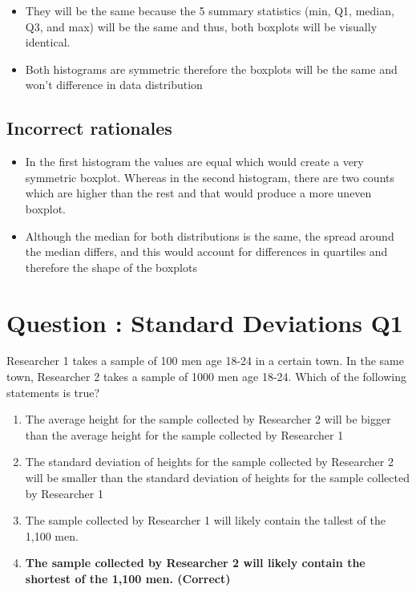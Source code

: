 \documentclass[letterpaper,9pt,twoside,printwatermark=false]{pinp}
\providecommand{\tightlist}{%
  \setlength{\itemsep}{0pt}\setlength{\parskip}{0pt}}
\begin{document}
\begin{itemize}
\tightlist
\item
  They will be the same because the 5 summary statistics (min, Q1,
  median, Q3, and max) will be the same and thus, both boxplots will be
  visually identical.
\item
  Both histograms are symmetric therefore the boxplots will be the same
  and won't difference in data distribution
\end{itemize}

\subsection{Incorrect rationales}\label{incorrect-rationales-2}

\begin{itemize}
\tightlist
\item
  In the first histogram the values are equal which would create a very
  symmetric boxplot. Whereas in the second histogram, there are two
  counts which are higher than the rest and that would produce a more
  uneven boxplot.
\item
  Although the median for both distributions is the same, the spread
  around the median differs, and this would account for differences in
  quartiles and therefore the shape of the boxplots
\end{itemize}

\section{Question : Standard Deviations
Q1}\label{question-standard-deviations-q1}

Researcher 1 takes a sample of 100 men age 18-24 in a certain town. In
the same town, Researcher 2 takes a sample of 1000 men age 18-24. Which
of the following statements is true?

\begin{enumerate}
\def\labelenumi{\alph{enumi})}
\tightlist
\item
  The average height for the sample collected by Researcher 2 will be
  bigger than the average height for the sample collected by Researcher
  1
\item
  The standard deviation of heights for the sample collected by
  Researcher 2 will be smaller than the standard deviation of heights
  for the sample collected by Researcher 1
\item
  The sample collected by Researcher 1 will likely contain the tallest
  of the 1,100 men.
\item
  \textbf{The sample collected by Researcher 2 will likely contain the
  shortest of the 1,100 men. (Correct)}
\end{enumerate}
\end{document}
